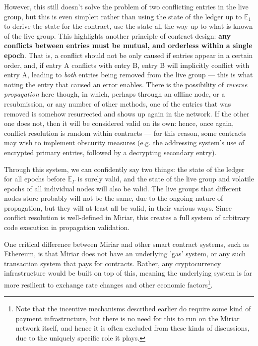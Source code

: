 \documentclass{extreport}
\begin{document}
However, this still doesn't solve the problem of two conflicting entries in the live group, but this is even simpler: rather than using the state of the ledger up to \(\mathbb{E}_1\) to derive the state for the contract, use the state all the way up to what is known of the live group. This highlights another principle of contract design: \textbf{any conflicts between entries must be mutual, and orderless within a single epoch}. That is, a conflict should not be only caused if entries appear in a certain order, and, if entry A conflicts with entry B, entry B will implicitly conflict with entry A, leading to \emph{both} entries being removed from the live group --- this is what noting the entry that caused an error enables. There is the possibility of \emph{reverse propagation} here though, in which, perhaps through an offline node, or a resubmission, or any number of other methods, one of the entries that was removed is somehow resurrected and shows up again in the network. If the other one does not, then it will be considered valid on its own: hence, once again, conflict resolution is random within contracts --- for this reason, some contracts may wish to implement obscurity measures (e.g. the addressing system's use of encrypted primary entries, followed by a decrypting secondary entry).

Through this system, we can confidently say two things: the state of the ledger for all epochs before \(\mathbb{E}_\Gamma\) is surely valid, and the state of the live group and volatile epochs of all individual nodes will also be valid. The live groups that different nodes store probably will not be the same, due to the ongoing nature of propagation, but they will at least all be valid, in their various ways. Since conflict resolution is well-defined in Miriar, this creates a full system of arbitrary code execution in propagation validation.

One critical difference between Miriar and other smart contract systems, such as Ethereum, is that Miriar does not have an underlying 'gas' system, or any such transaction system that pays for contracts. Rather, any cryptocurrency infrastructure would be built on top of this, meaning the underlying system is far more resilient to exchange rate changes and other economic factors\footnote{Note that the incentive mechanisms described earlier do require some kind of payment infrastructure, but there is no need for this to run on the Miriar network itself, and hence it is often excluded from these kinds of discussions, due to the uniquely specific role it plays.}.
\end{document}
